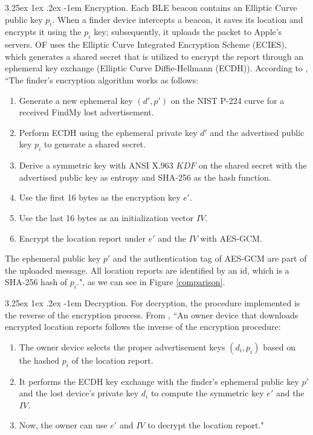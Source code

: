 \documentclass[english]{article}
\makeatletter
\renewcommand\paragraph{\@startsection{paragraph}{5}{\z@}%
  {3.25ex \@plus1ex \@minus.2ex}%
  {-1em}%
  {\normalfont\normalsize\bfseries}}
\makeatother
\begin{document}
\paragraph{Encryption.}
Each BLE beacon contains an Elliptic Curve public key $p_i$. When a finder device intercepts a beacon, it saves its location and encrypts it using the $p_i$ key; subsequently, it uploads the packet to Apple's servers.
OF uses the Elliptic Curve Integrated Encryption Scheme (ECIES), which generates a shared secret that is utilized to encrypt the report through an ephemeral key exchange (Elliptic Curve Diffie-Hellmann (ECDH)). According to \cite{whocanfind}, ``The finder’s encryption algorithm works as follows:
\begin{enumerate}
  \item Generate a new ephemeral key $(d', p')$ on the NIST P-224 curve for a received FindMy lost advertisement.
  \item Perform ECDH using the ephemeral private key $d'$ and the advertised public key $p_i$ to generate a shared secret.
  \item Derive a symmetric key with ANSI X.963 $KDF$ on the shared secret with the advertised public key as entropy and SHA-256 as the hash function.
  \item Use the first 16 bytes as the encryption key $e'$.
  \item Use the last 16 bytes as an initialization vector $IV$.
  \item Encrypt the location report under $e'$ and the $IV$ with AES-GCM. 
\end{enumerate} 
The ephemeral public key $p'$ and the authentication tag of AES-GCM are part of the uploaded message. All location reports are identified by
an id, which is a SHA-256 hash of $p_i$.", as we can see in Figure \ref{comparison}.

\paragraph{Decryption.}
For decryption, the procedure implemented is the reverse of the encryption process. From \cite{whocanfind}, ``An owner device that downloads encrypted location reports follows the inverse of the encryption procedure:
\begin{enumerate}
  \item The owner device selects the proper advertisement keys $(d_i, p_i)$ based on the hashed $p_i$ of the location report.
  \item It performs the ECDH key exchange with the finder’s ephemeral public key $p'$ and the lost device’s private key $d_i$ to compute the symmetric key $e'$ and the $IV$.
  \item Now, the owner can use $e'$ and $IV$ to decrypt the location report."
\end{enumerate}
\end{document}
